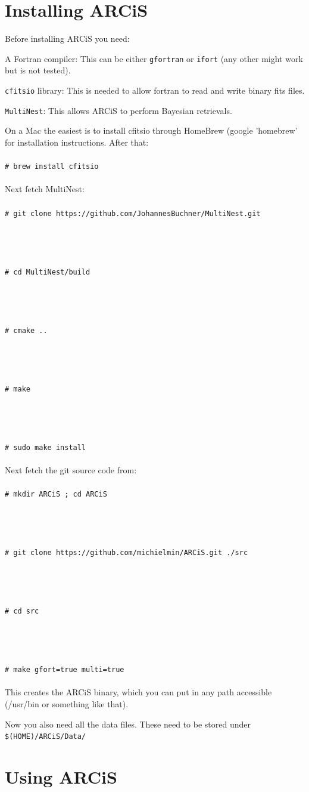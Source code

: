 \documentclass[12pt]{article}
\newcommand{\shellcmd}[1]{\\ \\ \indent\indent\texttt{\# #1}\\ \\ }
\begin{document}
\section{Installing ARCiS}

Before installing ARCiS you need:
\begin{description}
\item{A Fortran compiler:} This can be either \texttt{gfortran} or \texttt{ifort} (any other might work but is not tested).
\item{\texttt{cfitsio} library:} This is needed to allow fortran to read and write binary fits files.
\item{\texttt{MultiNest}:} This allows ARCiS to perform Bayesian retrievals.
\end{description}

On a Mac the easiest is to install cfitsio through HomeBrew (google 'homebrew' for installation instructions. After that:
%
\shellcmd{brew install cfitsio}
%
Next fetch MultiNest:
%
\shellcmd{git clone https://github.com/JohannesBuchner/MultiNest.git}
\vspace{-2cm}\\
\shellcmd{cd MultiNest/build}
\vspace{-2cm}\\
\shellcmd{cmake ..}
\vspace{-2cm}\\
\shellcmd{make}
\vspace{-2cm}\\
\shellcmd{sudo make install}


Next fetch the git source code from:
%
\shellcmd{mkdir ARCiS ; cd ARCiS}
\vspace{-2cm}\\
\shellcmd{git clone https://github.com/michielmin/ARCiS.git ./src}
\vspace{-2cm}\\
\shellcmd{cd src}
\vspace{-2cm}\\
\shellcmd{make gfort=true multi=true}
%
This creates the ARCiS binary, which you can put in any path accessible (/usr/bin or something like that).

Now you also need all the data files. These need to be stored under \texttt{\$(HOME)/ARCiS/Data/}

\section{Using ARCiS}
\end{document}

